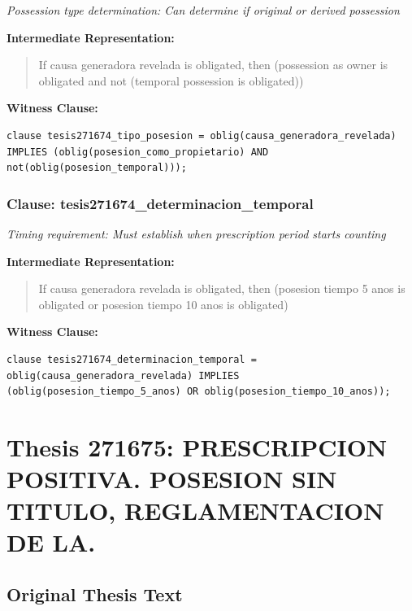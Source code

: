 \documentclass[11pt,a4paper]{article}
\begin{document}
\textit{Possession type determination: Can determine if original or derived possession}

\textbf{Intermediate Representation:}

\begin{quote}
If causa generadora revelada is obligated, then (possession as owner is obligated and not (temporal possession is obligated))
\end{quote}

\textbf{Witness Clause:}

\begin{lstlisting}[style=witnessstyle, language=Witness]
clause tesis271674_tipo_posesion = oblig(causa_generadora_revelada) IMPLIES (oblig(posesion_como_propietario) AND not(oblig(posesion_temporal)));
\end{lstlisting}

\subsubsection{Clause: tesis271674\_determinacion\_temporal}

\textit{Timing requirement: Must establish when prescription period starts counting}

\textbf{Intermediate Representation:}

\begin{quote}
If causa generadora revelada is obligated, then (posesion tiempo 5 anos is obligated or posesion tiempo 10 anos is obligated)
\end{quote}

\textbf{Witness Clause:}

\begin{lstlisting}[style=witnessstyle, language=Witness]
clause tesis271674_determinacion_temporal = oblig(causa_generadora_revelada) IMPLIES (oblig(posesion_tiempo_5_anos) OR oblig(posesion_tiempo_10_anos));
\end{lstlisting}

\newpage

\section{Thesis 271675: PRESCRIPCION POSITIVA. POSESION SIN TITULO, REGLAMENTACION DE LA.}
\label{thesis:271675}

\subsection{Original Thesis Text}
\end{document}
